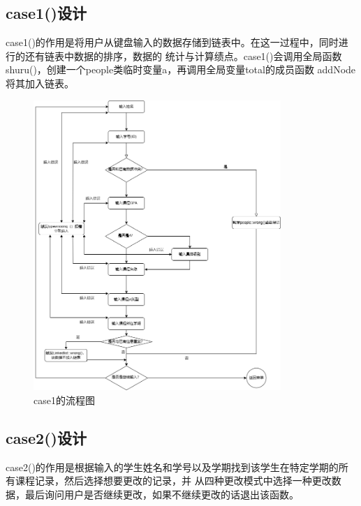 \documentclass[fontset=windows]{article}
\begin{document}
\subsection{case1()设计}
case1()的作用是将用户从键盘输入的数据存储到链表中。在这一过程中，同时进行的还有链表中数据的排序，数据的
统计与计算绩点。case1()会调用全局函数shuru()，创建一个people类临时变量a，再调用全局变量total的成员函数
addNode将其加入链表。

\vspace{0.5cm}
\begin{figure}[h]
	\begin{center}
		\includegraphics[height = 11cm]{case1.png}
		\vspace{1cm}
		\caption{case1的流程图}
	\end{center}
\end{figure}
\subsection{case2()设计}
case2()的作用是根据输入的学生姓名和学号以及学期找到该学生在特定学期的所有课程记录，然后选择想要更改的记录，并
从四种更改模式中选择一种更改数据，最后询问用户是否继续更改，如果不继续更改的话退出该函数。
\end{document}
